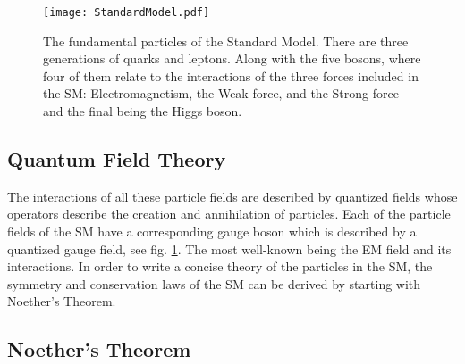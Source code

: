 \begin{figure}
 	\centering
	\texttt{[image: StandardModel.pdf]}
 	\caption[Standard Model particles]{The fundamental particles of the Standard Model. There are three generations of quarks and leptons. Along with the five bosons, where four of them relate to the interactions of the three forces included in the SM: Electromagnetism, the Weak force, and the Strong force and the final being the Higgs boson.}
 	\label{SMParticles} 
\end{figure}
 
 \subsection{Quantum Field Theory}
 \label{QFT}
 
 The interactions of all these particle fields are described by quantized fields whose operators describe the creation and annihilation of particles. Each of the particle fields of the SM have a corresponding gauge boson which is described by a quantized gauge field, see fig. \ref{SMParticles}. The most well-known being the EM field and its interactions. In order to write a concise theory of the particles in the SM, the symmetry and conservation laws of the SM can be derived by starting with Noether's Theorem.
 
 \subsection{Noether's Theorem}
 

